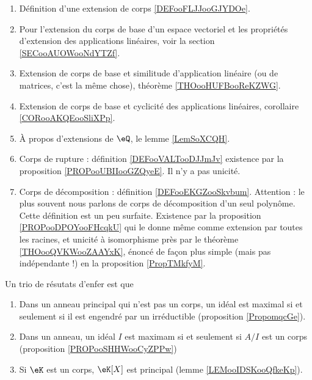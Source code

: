 
 \label{THEMEooZYKFooQXhiPD}
    \begin{enumerate}
        \item
            Définition d'une extension de corps \ref{DEFooFLJJooGJYDOe}.
        \item
            Pour l'extension du corps de base d'un espace vectoriel et les propriétés d'extension des applications linéaires, voir la section \ref{SECooAUOWooNdYTZf}.
        \item
            Extension de corps de base et similitude d'application linéaire (ou de matrices, c'est la même chose), théorème \ref{THOooHUFBooReKZWG}.
        \item
            Extension de corps de base et cyclicité des applications linéaires, corollaire \ref{CORooAKQEooSliXPp}.
        \item 
            À propos d'extensions de \( \eQ\), le lemme \ref{LemSoXCQH}.
        \item
            Corps de rupture : définition \ref{DEFooVALTooDJJmJv} existence par la proposition \ref{PROPooUBIIooGZQyeE}. Il n'y a pas unicité.
        \item
            Corps de décomposition : définition \ref{DEFooEKGZooSkvbum}. Attention : le plus souvent nous parlons de corps de décomposition d'un seul polynôme. Cette définition est un peu surfaite. Existence par la proposition \ref{PROPooDPOYooFHcqkU} qui le donne même comme extension par toutes les racines, et unicité à isomorphisme près par le théorème \ref{THOooQVKWooZAAYxK}, énoncé de façon plus simple (mais pas indépendante !) en la proposition \ref{PropTMkfyM}.
    \end{enumerate}

Un trio de résutats d'enfer est que
\begin{enumerate}
    \item
        Dans un anneau principal qui n'est pas un corps, un idéal est maximal si et seulement si il est engendré par un irréductible (proposition \ref{PropomqcGe}).
    \item
        Dans un anneau, un idéal \( I\) est maximam si et seulement si \( A/I\) est un corps (proposition \ref{PROPooSHHWooCyZPPw})
    \item
        Si \( \eK\) est un corps, \( \eK[X]\) est principal (lemme \ref{LEMooIDSKooQfkeKp}).
\end{enumerate}


